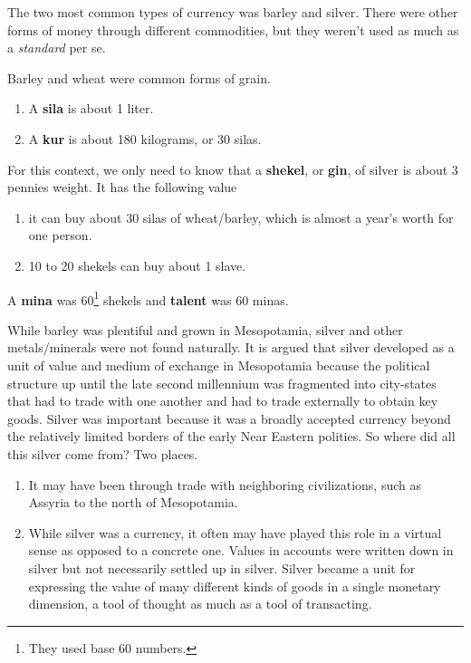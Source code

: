 \documentclass{article}
\begin{document}
    The two most common types of currency was barley and silver. There were other forms of money through different commodities, but they weren't used as much as a \textit{standard} per se. 

    \begin{definition}
      \label{def:denominations-of-grain}
 
      Barley and wheat were common forms of grain. 
      \begin{enumerate}
        \item A \textbf{sila} is about 1 liter. 
        \item A \textbf{kur} is about 180 kilograms, or 30 silas.
      \end{enumerate}
    \end{definition}

    \begin{definition}
      \label{def:denominations-of-silver}
      For this context, we only need to know that a \textbf{shekel}, or \textbf{gin}, of silver is about 3 pennies weight. It has the following value 
      \begin{enumerate}
        \item it can buy about 30 silas of wheat/barley, which is almost a year's worth for one person. 
        \item 10 to 20 shekels can buy about 1 slave. 
      \end{enumerate}
      A \textbf{mina} was 60\footnote{They used base 60 numbers.} shekels and \textbf{talent} was 60 minas. 
    \end{definition}

    While barley was plentiful and grown in Mesopotamia, silver and other metals/minerals were not found naturally. It is argued that silver developed as a unit of value and medium of exchange in Mesopotamia because the political structure up until the late second millennium was fragmented into city-states that had to trade with one another and had to trade externally to obtain key goods. Silver was important because it was a broadly accepted currency beyond the relatively limited borders of the early Near Eastern polities. So where did all this silver come from? Two places. 
    \begin{enumerate}
      \item It may have been through trade with neighboring civilizations, such as Assyria to the north of Mesopotamia. 
      \item While silver was a currency, it often may have played this role in a virtual sense as opposed to a concrete one. Values in accounts were written down in silver but not necessarily settled up in silver. Silver became a unit for expressing the value of many different kinds of goods in a single monetary dimension, a tool of thought as much as a tool of transacting. 
    \end{enumerate}
\end{document}
